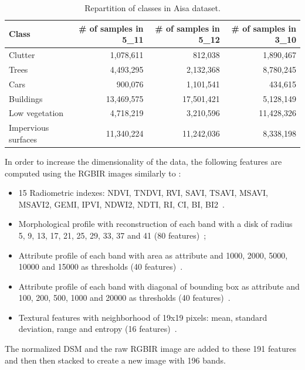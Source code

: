 \documentclass[journal,peerreview,onecolumn]{IEEEtran}
\begin{document}
    \begin{table}[!t]
        \centering
        \caption{Repartition of classes in Aisa dataset.\label{tab:potsdam}}
        \begin{tabular}[b]{lrrr}\toprule
          Class & \# of samples in 5\_11  & \#  of samples in 5\_12  & \#  of samples in 3\_10 \\
          \midrule
          Clutter             & 1,078,611  & 812,038    & 1,890,467 \\
          Trees               & 4,493,295  & 2,132,368  & 8,780,245 \\
          Cars                & 900,076    & 1,101,541  & 434,615 \\
          Buildings           & 13,469,575 & 17,501,421 & 5,128,149 \\
          Low vegetation      & 4,718,219  & 3,210,596  & 11,428,326 \\
          Impervious surfaces & 11,340,224 & 11,242,036 & 8,338,198 \\
          \bottomrule
        \end{tabular}
    \end{table}

    In order to increase the dimensionality of the data, the following features are computed using the RGBIR images similarly to \cite{tuia2015multiclass}:
    \begin{itemize}
        \item 15 Radiometric indexes: NDVI, TNDVI, RVI, SAVI, TSAVI, MSAVI, MSAVI2, GEMI, IPVI, NDWI2, NDTI, RI, CI, BI, BI2~\cite{otb}.
        \item Morphological profile with reconstruction of each band with a disk of radius 5, 9, 13, 17, 21, 25, 29, 33, 37 and 41 (80 features)~\cite{fauvel2013advances};
        \item Attribute profile of each band with area as attribute and 1000, 2000, 5000, 10000 and 15000 as thresholds (40 features)~\cite{dalla2010morphological}.
        \item Attribute profile of each band with diagonal of bounding box as attribute and 100, 200, 500, 1000 and 20000 as thresholds (40 features)~\cite{dalla2010morphological}.
        \item Textural features with neighborhood of 19x19 pixels: mean, standard deviation, range and entropy (16 features)~\cite{otb}.
    \end{itemize}
    The normalized DSM and the raw  RGBIR image are added to these 191
    features and  then then  stacked to  create a  new image  with 196
    bands. %
\end{document}
